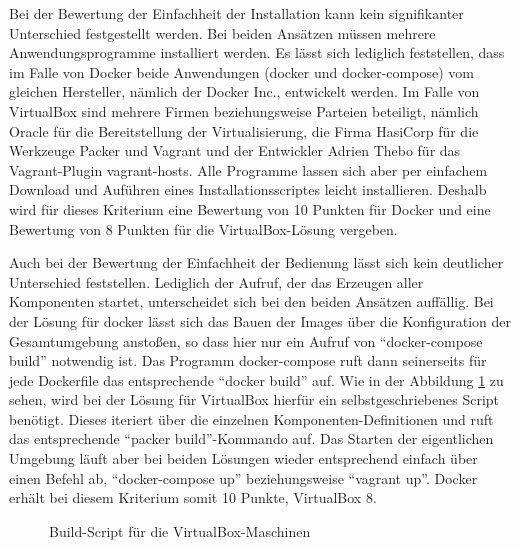 Bei der Bewertung der Einfachheit der Installation kann kein signifikanter Unterschied festgestellt werden. Bei beiden Ansätzen müssen mehrere Anwendungsprogramme installiert werden. Es lässt sich lediglich feststellen, dass im Falle von Docker beide Anwendungen (docker und docker-compose) vom gleichen Hersteller, nämlich der Docker Inc., entwickelt werden. Im Falle von VirtualBox sind mehrere Firmen beziehungsweise Parteien beteiligt, nämlich Oracle für die Bereitstellung der Virtualisierung, die Firma HasiCorp für die Werkzeuge Packer und Vagrant und der Entwickler Adrien Thebo für das Vagrant-Plugin vagrant-hosts. Alle Programme lassen sich aber per einfachem Download und Auführen eines Installationsscriptes leicht installieren. Deshalb wird für dieses Kriterium eine Bewertung von 10 Punkten für Docker und eine Bewertung von 8 Punkten für die VirtualBox-Lösung vergeben.

Auch bei der Bewertung der Einfachheit der Bedienung lässt sich kein deutlicher Unterschied feststellen. Lediglich der Aufruf, der das Erzeugen aller Komponenten startet, unterscheidet sich bei den beiden Ansätzen auffällig. Bei der Lösung für docker lässt sich das Bauen der Images über die Konfiguration der Gesamtumgebung anstoßen, so dass hier nur ein Aufruf von "`docker-compose build"' notwendig ist. Das Programm docker-compose ruft dann seinerseits für jede Dockerfile das entsprechende "`docker build"' auf. Wie in der Abbildung \ref{buildvb} zu sehen, wird bei der Lösung für VirtualBox hierfür ein selbstgeschriebenes Script benötigt. Dieses iteriert über die einzelnen Komponenten-Definitionen und ruft das entsprechende "`packer build"'-Kommando auf. Das Starten der eigentlichen Umgebung läuft aber bei beiden Lösungen wieder entsprechend einfach über einen Befehl ab, "`docker-compose up"' beziehungsweise "`vagrant up"'. Docker erhält bei diesem Kriterium somit 10 Punkte, VirtualBox 8.

\begin{figure}[!ht]
  \begin{center}
    \caption{Build-Script für die VirtualBox-Maschinen}
    \label{buildvb}
  \end{center}
\end{figure}

